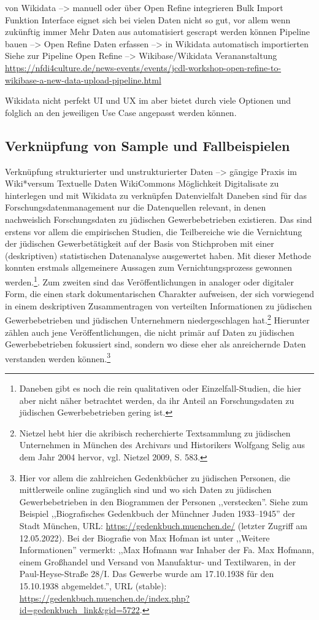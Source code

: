 von Wikidata --> manuell oder über Open Refine integrieren Bulk Import Funktion
Interface eignet sich bei vielen Daten nicht so gut, vor allem wenn zukünftig immer Mehr Daten aus automatisiert gescrapt werden können Pipeline bauen --> Open Refine Daten erfassen --> in Wikidata automatisch importierten
Siehe zur Pipeline Open Refine --> Wikibase/Wikidata Verananstaltung \url{https://nfdi4culture.de/news-events/events/jcdl-workshop-open-refine-to-wikibase-a-new-data-upload-pipeline.html}

Wikidata nicht perfekt UI und UX im aber bietet durch viele Optionen und folglich an den jeweiligen Use Case angepasst werden können.
\subsection{Verknüpfung von Sample und Fallbeispielen}
Verknüpfung strukturierter und unstrukturierter Daten --> gängige Praxis im Wiki*versum
Textuelle Daten
WikiCommons Möglichkeit Digitalisate zu hinterlegen und mit Wikidata zu verknüpfen
Datenvielfalt
Daneben sind für das Forschungsdatenmanagement nur die Datenquellen relevant, in denen nachweislich Forschungsdaten zu jüdischen Gewerbebetrieben existieren. Das sind erstens vor allem die empirischen Studien, die Teilbereiche wie die Vernichtung der jüdischen Gewerbetätigkeit auf der Basis von Stichproben mit einer (deskriptiven) statistischen Datenanalyse ausgewertet haben. Mit dieser Methode konnten erstmals allgemeinere Aussagen zum Vernichtungsprozess gewonnen werden.\footnote{Daneben gibt es noch die rein qualitativen oder Einzelfall-Studien, die hier aber nicht näher betrachtet werden, da ihr Anteil an Forschungsdaten zu jüdischen Gewerbebetrieben gering ist.}. Zum zweiten sind das Veröffentlichungen in analoger oder digitaler Form, die einen stark dokumentarischen Charakter aufweisen, der sich vorwiegend in einem deskriptiven Zusammentragen von verteilten Informationen zu jüdischen Gewerbebetrieben und jüdischen Unternehmern niedergeschlagen hat.\footnote{Nietzel hebt hier die akribisch recherchierte Textsammlung zu jüdischen Unternehmen in München des Archivars und Historikers Wolfgang Selig aus dem Jahr 2004 hervor, vgl. Nietzel 2009, S. 583.} Hierunter zählen auch jene Veröffentlichungen, die nicht primär auf Daten zu jüdischen Gewerbebetrieben fokussiert sind, sondern wo diese eher als anreichernde Daten verstanden werden können.\footnote{Hier vor allem die zahlreichen Gedenkbücher zu jüdischen Personen, die mittlerweile online zugänglich sind und wo sich Daten zu jüdischen Gewerbebetrieben in den Biogrammen der Personen ,,verstecken''. Siehe zum Beispiel ,,Biografisches Gedenkbuch der Münchner Juden 1933–1945'' der Stadt München, URL: \url{https://gedenkbuch.muenchen.de/} (letzter Zugriff am 12.05.2022). Bei der Biografie von Max Hofman ist unter ,,Weitere Informationen'' vermerkt: ,,Max Hofmann war Inhaber der Fa. Max Hofmann, einem Großhandel und Versand von Manufaktur- und Textilwaren, in der Paul-Heyse-Straße 28/I. Das Gewerbe wurde am 17.10.1938 für den 15.10.1938 abgemeldet.'', URL (stable): \url{https://gedenkbuch.muenchen.de/index.php?id=gedenkbuch_link&gid=5722}.}

